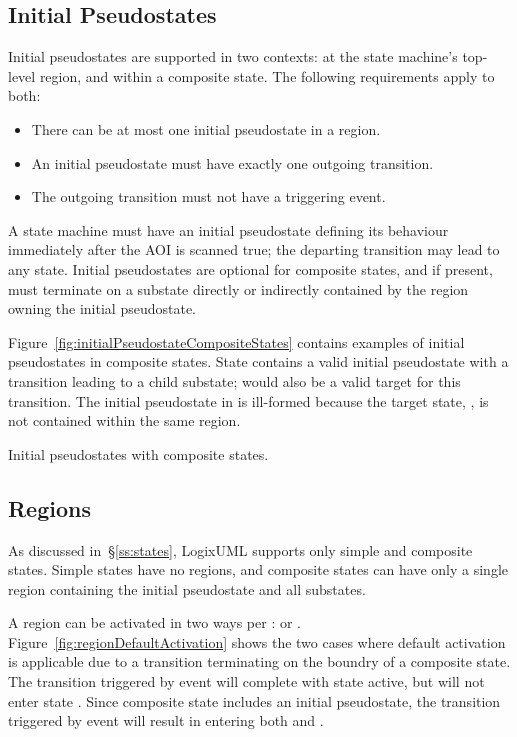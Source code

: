 \subsection{Initial Pseudostates}

Initial pseudostates are supported in two contexts: at the state machine's
top-level region, and within a composite state. The following requirements
apply to both:

\begin{itemize}
  \item There can be at most one initial pseudostate in a region.

  \item An initial pseudostate must have exactly one outgoing transition.

  \item The outgoing transition must not have a triggering event.
\end{itemize}

A state machine must have an initial pseudostate defining its behaviour
immediately after the AOI is scanned true; the departing transition may lead
to any state. Initial pseudostates are optional for composite states,
and if present, must terminate on a substate directly or indirectly contained
by the region owning the initial pseudostate.

Figure~\ref{fig:initialPseudostateCompositeStates} contains examples of
initial pseudostates in composite states. State 
contains a valid initial pseudostate with a transition leading to
a child substate;  would also be a valid target
for this transition. The initial pseudostate in  is
ill-formed because the target state, , is not contained within
the same region.

               {Initial pseudostates with composite states.}


\subsection{Regions}

As discussed in~\S\ref{ss:states}, LogixUML supports only simple and
composite states. Simple states have no regions, and composite states
can have only a single region containing the initial pseudostate and
all substates.

A region can be activated in two ways per \textcite[\S14.2.3.2]{OMGUML}:
 or
.
Figure~\ref{fig:regionDefaultActivation} shows the two cases where
default activation is applicable due to a transition terminating
on the boundry of a composite state. The transition triggered by
event  will complete with state 
active, but will not enter state .
Since composite state  includes an initial
pseudostate, the transition triggered by event  will
result in entering both  and .

